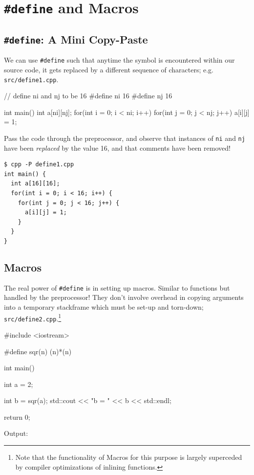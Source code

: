 \documentclass[12pt,letterpaper,twoside]{article}
\begin{document}
\section{\texttt{\#define} and Macros}
\subsection{\texttt{\#define}: A Mini Copy-Paste}
We can use \texttt{\#define} such that anytime the symbol is encountered within our
source code, it gets replaced by a different sequence of characters; e.g.
\texttt{src/define1.cpp}.

\begin{cpp}
// define ni and nj to be 16
#define ni 16
#define nj 16

int main() {
  int a[ni][nj];
  for(int i = 0; i < ni; i++) {
    for(int j = 0; j < nj; j++) {
      a[i][j] = 1;
    }
  }
}
\end{cpp}

Pass the code through the preprocessor, and observe that instances of \texttt{ni} and 
\texttt{nj} have been \emph{replaced} by the value 16, and that comments have been removed!

\begin{verbatim}
$ cpp -P define1.cpp
int main() {
  int a[16][16];
  for(int i = 0; i < 16; i++) {
    for(int j = 0; j < 16; j++) {
      a[i][j] = 1;
    }
  }
}
\end{verbatim}

\subsection{Macros}
The real power of \texttt{\#define} is in setting up macros.
Similar to functions but handled by the preprocessor! They don't involve overhead in
copying arguments into a temporary stackframe which must be set-up and torn-down;
\texttt{src/define2.cpp}.\footnote{Note that
the functionality of Macros for this purpose is largely superceded by compiler optimizations
of inlining functions.}

\begin{cpp}
#include <iostream>

#define sqr(n) (n)*(n)

int main() {
  int a = 2;

  int b = sqr(a);
  std::cout << "b = " << b << std::endl;

  return 0;
}
\end{cpp}

Output:
\end{document}
